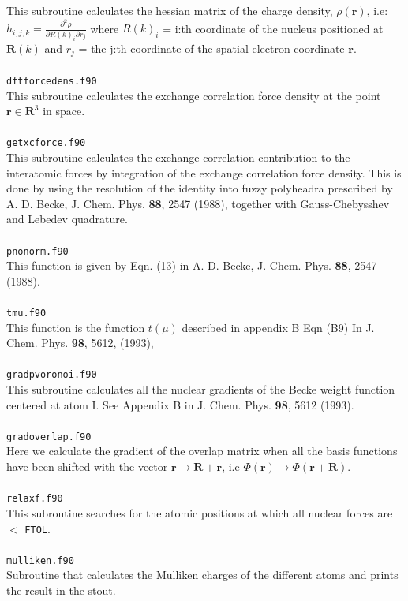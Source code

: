 \documentclass[a4paper,twoside,openany]{book}
\begin{document}
{{This subroutine calculates the hessian matrix 
of the charge density, $\rho (\mathbf{r})$, i.e:  \\
$h_{i,j,k} = \frac{\partial^2\rho}{\partial R(k)_{i} \partial r_{j}}$
where $R(k)_{i}$ = i:th coordinate of the nucleus positioned 
at $\mathbf{R}(k)$ and  $r_{j}$ = the j:th coordinate of the spatial electron 
coordinate $\mathbf{r}$. \\ \\
\texttt{dftforcedens.f90}\\
This subroutine calculates the exchange correlation force density 
at the point $\mathbf{r}\in\mathbf{R}^{3}$ in space.      \\ \\  
\texttt{getxcforce.f90}\\
This subroutine calculates the exchange correlation contribution to the interatomic forces  by integration of the  exchange correlation force density. This is done  by using the resolution of the identity into fuzzy
polyheadra prescribed by A. D. Becke, J. Chem. Phys. {\bf 88}, 2547 (1988), together with Gauss-Chebysshev and Lebedev quadrature. \\ \\        
\texttt{pnonorm.f90}\\
This function is given by Eqn. (13)
in A. D. Becke, J. Chem. Phys. {\bf 88}, 2547 (1988).\\ \\
\texttt{tmu.f90}\\
This function is the function $t(\mu)$
described in appendix B Eqn (B9)
In J. Chem. Phys. {\bf 98}, 5612, (1993), \\ \\
\texttt{gradpvoronoi.f90}\\
This subroutine calculates all the nuclear gradients of the Becke weight 
 function centered at atom I. See Appendix B in J. Chem. Phys. {\bf 98}, 5612 (1993). \\ \\
\texttt{gradoverlap.f90}\\
 Here we calculate the gradient of the overlap matrix
when all the basis functions have been
shifted with the vector $\mathbf{r}  \rightarrow \mathbf{R}+\mathbf{r}$, i.e $\Phi(\mathbf{r}) \rightarrow \Phi(\mathbf{r}+\mathbf{R})$. \\ \\
\texttt{relaxf.f90}\\
This subroutine searches for the atomic positions at which all nuclear forces are $<$ \texttt{FTOL}. \\  \\
\texttt{mulliken.f90} \\
Subroutine that calculates the Mulliken charges of the different atoms and prints the result in the stout.                  

}}
\end{document}
